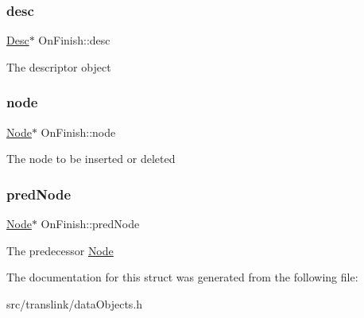 \subsubsection{\texorpdfstring{desc}{desc}}
{\footnotesize\ttfamily \hyperlink{structDesc}{Desc}$\ast$ On\+Finish\+::desc}

The descriptor object \mbox{\label{structOnFinish_a09176017b5eb8bfe93aefac9ec274afd}} 
\subsubsection{\texorpdfstring{node}{node}}
{\footnotesize\ttfamily \hyperlink{structNode}{Node}$\ast$ On\+Finish\+::node}

The node to be inserted or deleted \mbox{\label{structOnFinish_ab5009de05956749c669b9a65952296d3}} 
\subsubsection{\texorpdfstring{pred\+Node}{predNode}}
{\footnotesize\ttfamily \hyperlink{structNode}{Node}$\ast$ On\+Finish\+::pred\+Node}

The predecessor \hyperlink{structNode}{Node} 

The documentation for this struct was generated from the following file\+:\begin{DoxyCompactItemize}
\item 
src/translink/data\+Objects.\+h\end{DoxyCompactItemize}
